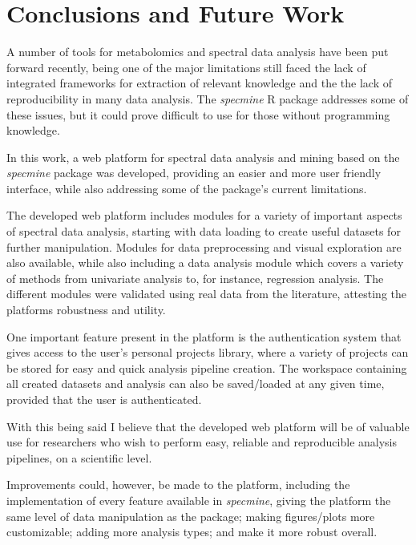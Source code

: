 
\chapter{Conclusions and Future Work}

A number of tools for metabolomics and spectral data analysis have been put forward recently, being one of the major limitations still faced the lack of integrated frameworks for extraction of relevant knowledge and the the lack of reproducibility in many data analysis. The \textit{specmine} R package addresses some of these issues, but it could prove difficult to use for those without programming knowledge. 

In this work, a web platform for spectral data analysis and mining based on the \textit{specmine} package was developed, providing an easier and more user friendly interface, while also addressing some of the package's current limitations.

The developed web platform includes modules for a variety of important
aspects of spectral data analysis, starting with data loading to create useful datasets for further manipulation. Modules for data preprocessing and visual exploration are also available, while also including a data analysis module which covers a variety of methods from univariate analysis to, for instance, regression analysis. The different modules were validated using real data from the literature, attesting the platforms robustness and utility.

One important feature present in the platform is the authentication system that gives access to the user's personal projects library, where a variety of projects can be stored for easy and quick analysis pipeline creation. The workspace containing all created datasets and analysis can also be saved/loaded at any given time, provided that the user is authenticated.

With this being said I believe that the developed web platform will be of valuable use for researchers who wish to perform easy, reliable and reproducible analysis pipelines, on a scientific level.

Improvements could, however, be made to the platform, including the implementation of every feature available in \textit{specmine}, giving the platform the same level of data manipulation as the package; making figures/plots more customizable; adding more analysis types; and make it more robust overall.


